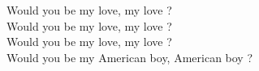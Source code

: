 Would you be my love, my love ? \\
Would you be my love, my love ? \\
Would you be my love, my love ? \\
Would you be my American boy, American boy ? \\

